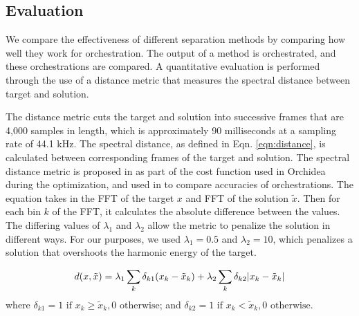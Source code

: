 \documentclass{article}
\begin{document}
		\subsection{Evaluation}
		We compare the effectiveness of different separation methods by comparing how well they work for orchestration. The output of a method is orchestrated, and these orchestrations are compared. A quantitative evaluation is performed through the use of a distance metric that measures the spectral distance between target and solution. 
		
		The distance metric cuts the target and solution into successive frames that are 4,000 samples in length, which is approximately 90 milliseconds at a sampling rate of 44.1 kHz. The spectral distance, as defined in Eqn. \ref{eqn:distance}, is calculated between corresponding frames of the target and solution. The spectral distance metric is proposed in \cite{Cella2020} as part of the cost function used in Orchidea during the optimization, and used in \cite{Cella2020b} to compare accuracies of orchestrations. The equation takes in the FFT of the target $x$ and FFT of the solution $\tilde{x}$. Then for each bin $k$ of the FFT, it calculates the absolute difference between the values. The differing values of $\lambda_1$ and $\lambda_2$ allow the metric to penalize the solution in different ways. For our purposes, we used $\lambda_1 = 0.5$ and $\lambda_2 = 10$, which penalizes a solution that overshoots the harmonic energy of the target.
		
		\begin{equation}\label{eqn:distance}
d(x, \tilde{x}) =\lambda_1 \sum_k \delta_{k1}(x_k - \tilde{x}_k) + \lambda_2 \sum_k \delta_{k2}|x_k - \tilde{x	}_k| \\
\end{equation}
where $\delta_{k1} = 1 \text{  if  } x_k \ge \tilde{x}_k, 0 \text{  otherwise}$; and $\delta_{k2} = 1 \text{  if  } x_k < \tilde{x}_k, 0 \text{  otherwise}$.
	
\end{document}
